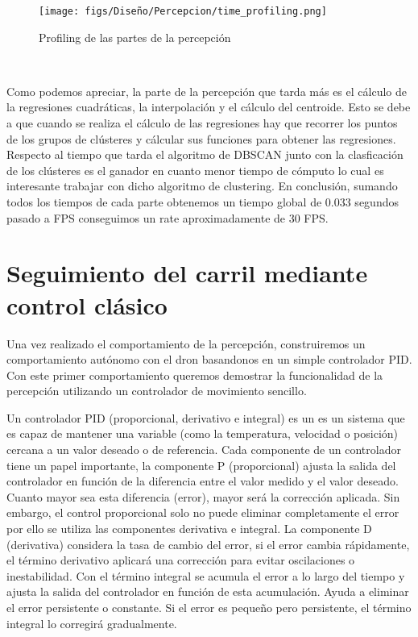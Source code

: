   \begin{figure} [H]
    \begin{center}
      \texttt{[image: figs/Diseño/Percepcion/time\_profiling.png]}
    \end{center}
    \caption{Profiling de las partes de la percepción}
    \label{fig:centro de masas}
  \end{figure}\

  Como podemos apreciar, la parte de la percepción que tarda más es el cálculo de la regresiones cuadráticas, la interpolación y el cálculo del centroide. Esto se debe a que
  cuando se realiza el cálculo de las regresiones hay que recorrer los puntos de los grupos de clústeres y cálcular sus funciones para obtener las regresiones. Respecto al 
  tiempo que tarda el algoritmo de DBSCAN junto con la clasficación de los clústeres es el ganador en cuanto menor tiempo de cómputo lo cual es interesante trabajar 
  con dicho algoritmo de clustering. En conclusión, sumando todos los tiempos de cada parte obtenemos un tiempo global de 0.033 segundos pasado a FPS conseguimos un rate aproximadamente
  de 30 FPS. 

  \section{Seguimiento del carril mediante control clásico}
  \label{sec:Control}

  Una vez realizado el comportamiento de la percepción, construiremos un comportamiento autónomo con el dron basandonos en un simple controlador PID. 
 Con este primer comportamiento queremos demostrar la funcionalidad de la percepción utilizando un controlador de movimiento sencillo. \newline

 Un controlador PID (proporcional, derivativo e integral) es un 
  es un sistema que es capaz de mantener una variable (como la temperatura, velocidad o posición) cercana a un valor deseado o de referencia. Cada componente de un controlador tiene un papel 
  importante,
  la componente P (proporcional) ajusta la salida del controlador en función de la diferencia entre el valor medido y el valor deseado. 
  Cuanto mayor sea esta diferencia (error), mayor será la corrección aplicada. Sin embargo, el control proporcional solo no puede eliminar completamente el error por ello se utiliza
  las componentes derivativa e integral. La componente D (derivativa) considera la tasa de cambio del error,
  si el error cambia rápidamente, el término derivativo aplicará una corrección para evitar oscilaciones o inestabilidad.
  Con el término integral se acumula el error a lo largo del tiempo y ajusta la salida del controlador en función de esta acumulación. 
  Ayuda a eliminar el error persistente o constante. Si el error es pequeño pero persistente, el término integral lo corregirá gradualmente.
  \newline

